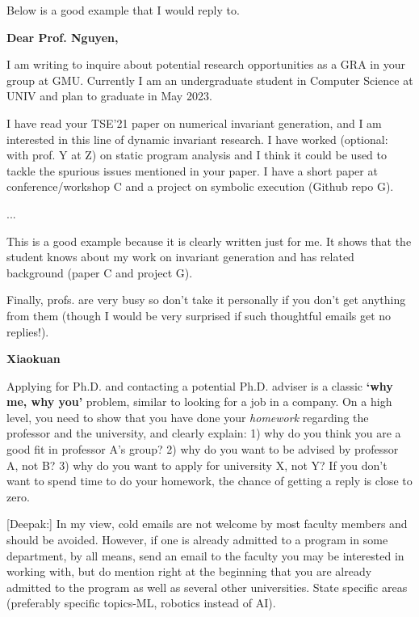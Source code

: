 \documentclass[oneside,11pt]{memoir}
\newenvironment{commentbox}[1][]{
  \small
  \begin{mybox}
    {\small \textbf{#1}}
  }{
  \end{mybox}
}
\begin{document}
Below is a good example that I would reply to.   

\begin{commentbox}[Dear Prof. Nguyen,]

  I am writing to inquire about potential research opportunities as a GRA in your group at GMU. Currently I am an undergraduate student in Computer Science at UNIV and plan to graduate in May 2023.


  I have read your TSE'21 paper on numerical invariant generation, and I am interested in this line of dynamic invariant research. I have worked (optional: with prof. Y at Z) on static program analysis and I think it could be used to tackle the spurious issues mentioned in your paper. I have a short paper at conference/workshop C and a project on symbolic execution (Github repo G).

  ...

  This is a good example because it is clearly written just for me.  It shows that the student knows about my work on invariant generation and has related  background (paper C and project G).
\end{commentbox}

Finally, profs. are very busy so don't take it personally if you don't get anything from them (though I would be very surprised if such thoughtful emails get no replies!). 


\begin{commentbox}[Xiaokuan]
  Applying for Ph.D. and contacting a potential Ph.D. adviser is a classic \textbf{`why me, why you'} problem,
  similar to looking for a job in a company.
  On a high level,
  you need to show that you have done your \emph{homework}
  regarding the professor and the university,
  and clearly explain:
  1) why do you think you are a good fit in professor A's group?
  2) why do you want to be advised by professor A, not B?
  3) why do you want to apply for university X, not Y?
  If you don't want to spend time to do your homework,
  the chance of getting a reply is close to zero.
\end{commentbox}


\begin{commentbox}
  [Deepak:]
  In my view, cold emails are not welcome by most faculty members and should be avoided. However, if one is already admitted to a program in some department, by all means, send an email to the faculty you may be interested in working with, but do mention right at the beginning that you are already admitted to the program as well as several other universities. State specific areas (preferably specific topics-ML, robotics instead of AI).
\end{commentbox}
\end{document}
